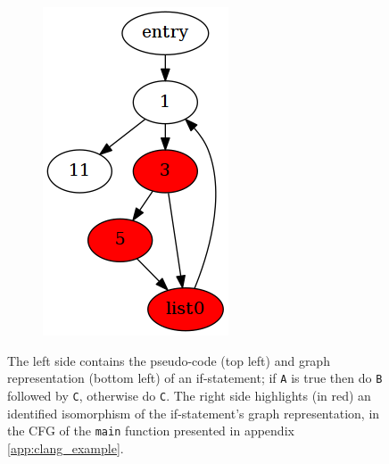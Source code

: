 \begin{figure}[htbp]
\begin{subfigure}[ht]{0.18\textwidth}
		\includegraphics[width=\textwidth]{poster/inc/foo.png}
	\end{subfigure}
	\caption{The left side contains the pseudo-code (top left) and graph representation (bottom left) of an if-statement; if \texttt{A} is true then do \texttt{B} followed by \texttt{C}, otherwise do \texttt{C}. The right side highlights (in red) an identified isomorphism of the if-statement's graph representation, in the CFG of the \texttt{main} function presented in appendix \ref{app:clang_example}.}
	\label{fig:representation_and_identification_of_primitive}
\end{figure}

